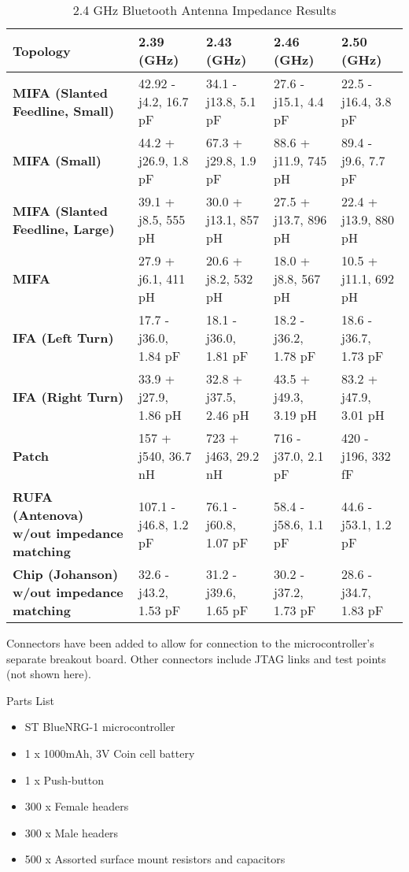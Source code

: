 \documentclass[journal]{IEEEtran}
\begin{document}
\begin{table*}[t]
  \centering
  \begin{tabular}{>{\bfseries}l|l l l l}
    Topology & 2.39 (GHz) & 2.43 (GHz) & 2.46 (GHz) & 2.50 (GHz) \\
    \hline
    MIFA (Slanted Feedline, Small) & 42.92 - j4.2, 16.7 pF & 34.1 - j13.8, 5.1 pF & 27.6 - j15.1, 4.4 pF & 22.5 - j16.4, 3.8 pF \\
    MIFA (Small) & 44.2 + j26.9, 1.8 pF & 67.3 + j29.8, 1.9 pF & 88.6 + j11.9, 745 pH & 89.4 - j9.6, 7.7 pF \\
    MIFA (Slanted Feedline, Large) & 39.1 + j8.5, 555 pH & 30.0 + j13.1, 857 pH & 27.5 + j13.7, 896 pH & 22.4 + j13.9, 880 pH \\
    MIFA & 27.9 + j6.1, 411 pH & 20.6 + j8.2, 532 pH & 18.0 + j8.8, 567 pH & 10.5 + j11.1, 692 pH \\
    IFA (Left Turn) & 17.7 - j36.0, 1.84 pF & 18.1 - j36.0, 1.81 pF & 18.2 - j36.2, 1.78 pF & 18.6 - j36.7, 1.73 pF \\
    IFA (Right Turn) & 33.9 + j27.9, 1.86 pH & 32.8 + j37.5, 2.46 pH & 43.5 + j49.3, 3.19 pH & 83.2 + j47.9, 3.01 pH \\
    Patch & 157 + j540, 36.7 nH & 723 + j463, 29.2 nH & 716 - j37.0, 2.1 pF & 420 - j196, 332 fF \\
    RUFA (Antenova) w/out impedance matching & 107.1 - j46.8, 1.2 pF & 76.1 - j60.8, 1.07 pF & 58.4 - j58.6, 1.1 pF & 44.6 - j53.1, 1.2 pF \\
    Chip (Johanson) w/out impedance matching & 32.6 - j43.2, 1.53 pF & 31.2 - j39.6, 1.65 pF & 30.2 - j37.2, 1.73 pF & 28.6 - j34.7, 1.83 pF
  \end{tabular}
  \caption{2.4 GHz Bluetooth Antenna Impedance Results}
\end{table*}

Connectors have been added to allow for connection to the microcontroller’s separate breakout board.  Other connectors include JTAG links and test points (not shown here).

Parts List
\begin{itemize}
  \item ST BlueNRG-1 microcontroller
  \item 1 x 1000mAh, 3V Coin cell battery
  \item 1 x Push-button
  \item 300 x Female headers
  \item 300 x Male headers
  \item 500 x Assorted surface mount resistors and capacitors
\end{itemize}
\end{document}
